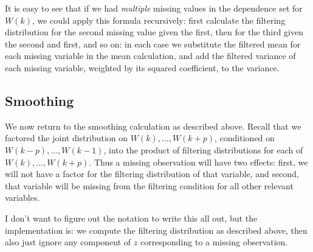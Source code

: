 \documentclass{article}
\begin{document}
It is easy to see that if we had {\em multiple} missing values in the dependence set for $W(k)$, we could apply this formula recursively: first calculate the filtering distribution for the second missing value given the first, then for the third given the second and first, and so on: in each case we substitute the filtered mean for each missing variable in the mean calculation, and add the filtered variance of each missing variable, weighted by its squared coefficient, to the variance.

\subsection{Smoothing}

We now return to the smoothing calculation as described above. Recall that we factored the joint distribution on $W(k), \ldots, W(k+p)$, conditioned on $W(k-p), \ldots, W(k-1)$, into the product of filtering distributions for each of $W(k), \ldots, W(k+p)$. Thus a missing observation will have two effects: first, we will not have a factor for the filtering distribution of that variable, and second, that variable will be missing from the filtering condition for all other relevant variables.

I don't want to figure out the notation to write this all out, but the implementation is: we compute the filtering distribution as described above, then also just ignore any component of $z$ corresponding to a missing observation.
\end{document}
